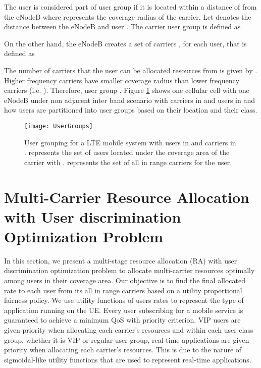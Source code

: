 \documentclass[journal]{IEEEtran} 				\IEEEoverridecommandlockouts 						\usepackage{amsmath,amssymb}
\begin{document}
The  user is considered part of user group  if it is located within a distance of  from the eNodeB where  represents the coverage radius of the  carrier. Let  denotes the distance between the eNodeB and user . The  carrier user group  is defined as


On the other hand, the eNodeB creates a set of carriers , for each user, that is defined as


The number of carriers that the  user can be allocated resources from is given by . Higher frequency carriers have smaller coverage radius than lower frequency carriers (i.e. ). Therefore, user group . Figure \ref{fig:UserGroups} shows one cellular cell with one eNodeB under non adjacent inter band scenario with  carriers in  and  users in  and how users are partitioned into user groups based on their location and their class.
\begin{figure}[tb]
\centering
\texttt{[image: UserGroups]}
\caption{User grouping for a LTE mobile system with  users in  and  carriers in .  represents the set of users located under the coverage area of the  carrier with .  represents the set of all in range carriers for the  user.}
\label{fig:UserGroups}
\end{figure}
\section{Multi-Carrier Resource Allocation with User discrimination Optimization Problem}\label{sec:ResourceAllocation}
In this section, we present a multi-stage resource allocation (RA) with user discrimination optimization problem to allocate multi-carrier resources optimally among users in their coverage area. Our objective is to find the final allocated rate to each user from its all in range carriers based on a utility proportional fairness policy. We use utility functions of users rates to represent the type of application running on the UE. Every user subscribing for a mobile service is guaranteed to achieve a minimum QoS with priority criterion. VIP users are given priority when allocating each carrier's resources and within each user class group, whether it is VIP or regular user group, real time applications are given priority when allocating each carrier's resources. This is due to the nature of sigmoidal-like utility functions that are used to represent real-time applications.
\end{document}
